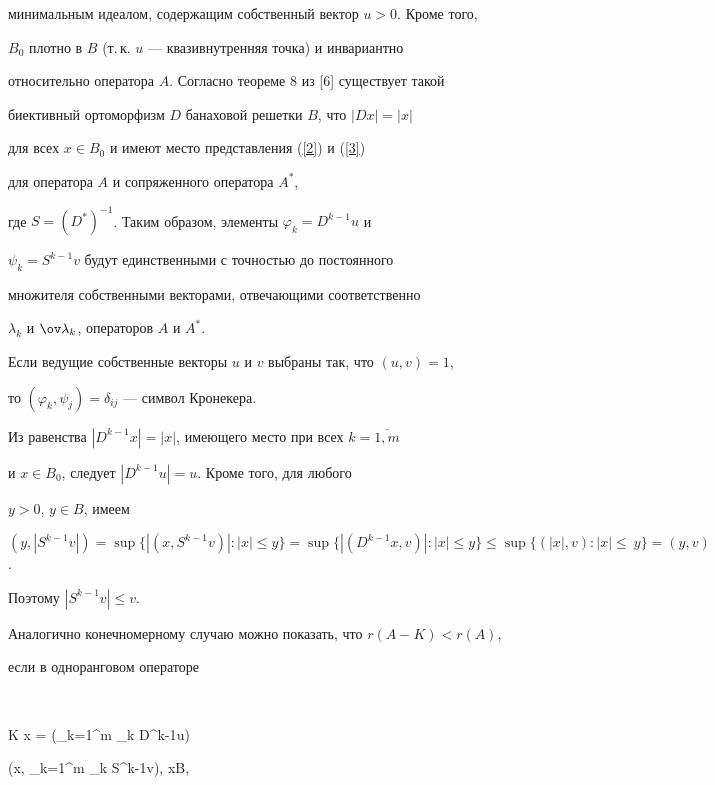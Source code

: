 минимальным идеалом, содержащим собственный вектор $u > 0$. Кроме того,


$B_0$ плотно в $B$ (т.\,к. $u$ --- квазивнутренняя точка) и инвариантно


относительно оператора $A$. Согласно теореме 8 из [6] существует такой


биективный ортоморфизм $D$ банаховой решетки $B$, что $|Dx| = |x|$


для всех $x\in B_0$ и имеют место представления (\ref{2}) и (\ref{3})


для оператора $A$ и сопряженного оператора $A^*$,


где $S = (D^*)^{-1}$. Таким образом, элементы $\varphi_k = D^{k-1}u$ и


$\psi_k = S^{k-1}v$ будут единственными с точностью до постоянного 


множителя собственными векторами, отвечающими соответственно


$\lambda_k$ и $\ov\lambda_k$, операторов $A$ и $A^*$.





Если ведущие собственные векторы $u$ и $v$ выбраны так, что $(u,v) = 1$,


то $(\varphi_k,\psi_j) = \delta_{ij}$ --- символ Кронекера.





Из равенства $|D^{k-1}x| = |x|$, имеющего место при всех $k = \overline{1,m}$


и $x\in B_0$, следует $|D^{k-1}u|{=}u$. Кроме того, для любого 


$y > 0$, $y\in B$, имеем


$(y,|S^{k-1}v|) = \sup \{|(x,S^{k-1}v)| : |x| \le y \} = 


\sup \{|(D^{k-1}x,v)| : |x| \le y \} \le 


\sup \{(|x|,v) : |x| \le~ y \} = (y,v)$.  


Поэтому $|S^{k-1}v| \le v$.





Аналогично конечномерному случаю можно показать, что $r(A - K) < r(A)$,


если в одноранговом операторе


$$


K x = \bigg(\sum_{k=1}^m \alpha_k D^{k-1}u\bigg)


\bigg(x, \sum_{k=1}^m \ov\beta_k S^{k-1}v\bigg), \quad x\in B,


